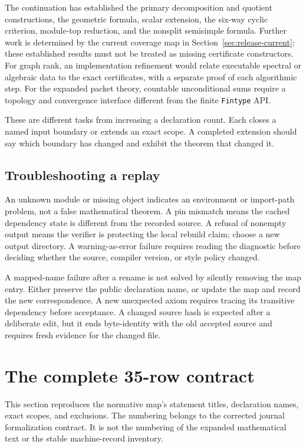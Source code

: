 \documentclass[11pt,a4paper]{article}
\newcommand{\code}[1]{\nolinkurl{#1}}
\begin{document}
The continuation has established the primary decomposition and quotient constructions, the geometric formula, scalar extension, the six-way cyclic criterion, module-top reduction, and the nonsplit semisimple formula. Further work is determined by the current coverage map in Section~\ref{sec:release-current}; these established results must not be treated as missing certificate constructors. For graph rank, an implementation refinement would relate executable spectral or algebraic data to the exact certificates, with a separate proof of each algorithmic step. For the expanded packet theory, countable unconditional sums require a topology and convergence interface different from the finite \code{Fintype} API.

These are different tasks from increasing a declaration count. Each closes a named input boundary or extends an exact scope. A completed extension should say which boundary has changed and exhibit the theorem that changed it.

\subsection{Troubleshooting a replay}

An unknown module or missing object indicates an environment or import-path problem, not a false mathematical theorem. A pin mismatch means the cached dependency state is different from the recorded source. A refusal of nonempty output means the verifier is protecting the local rebuild claim; choose a new output directory. A warning-as-error failure requires reading the diagnostic before deciding whether the source, compiler version, or style policy changed.

A mapped-name failure after a rename is not solved by silently removing the map entry. Either preserve the public declaration name, or update the map and record the new correspondence. A new unexpected axiom requires tracing its transitive dependency before acceptance. A changed source hash is expected after a deliberate edit, but it ends byte-identity with the old accepted source and requires fresh evidence for the changed file.

\clearpage
\section{The complete 35-row contract}\label{sec:map}

This section reproduces the normative map's statement titles, declaration names, exact scopes, and exclusions. The numbering belongs to the corrected journal formalization contract. It is not the numbering of the expanded mathematical text or the stable machine-record inventory.
\end{document}
